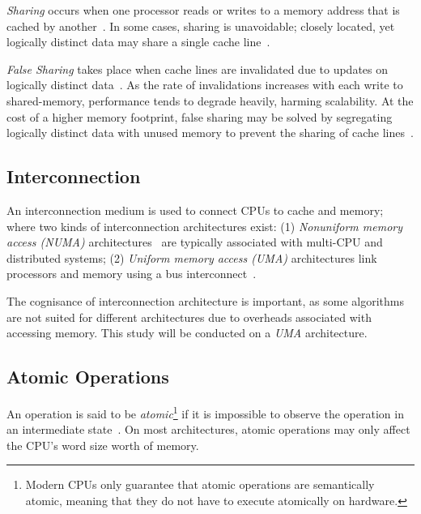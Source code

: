 \emph{Sharing} occurs when one processor reads or writes to a memory address that
is cached by another~\citep{herlihy2020art_cachecoherence}. In some cases,
sharing is unavoidable; closely located, yet
logically distinct data may share a single cache
line~\citep{herlihy2020art_cachecoherence}. 

\emph{False Sharing} takes place when cache lines are invalidated due to updates
on logically distinct data~\citep{herlihy2020art_cachecoherence}. As the
rate of invalidations increases with each write to shared-memory, performance
tends to degrade heavily, harming scalability. At the cost of a higher memory footprint, false
sharing may be solved by segregating logically distinct data with unused memory
to prevent the sharing of cache lines~\citep{scott2013shared}.

\subsection{Interconnection}

An interconnection medium is used to connect CPUs to cache and memory; where
two kinds of interconnection architectures exist: (1)
\emph{Nonuniform memory access (NUMA)}
architectures~\citep[Appendix~B.3]{herlihy2020art} are typically associated with
multi-CPU and distributed systems; (2) \emph{Uniform memory
access (UMA)} architectures link processors and memory using a bus
interconnect~\citep[Appendix~B.3]{herlihy2020art}.

The cognisance of interconnection architecture is important, 
as some algorithms are not suited for different architectures due to
overheads associated with accessing memory. This study will be
conducted on a \emph{UMA} architecture.

\subsection{Atomic Operations}
An operation is said to be \emph{atomic}\footnote{Modern CPUs only guarantee
that atomic operations are semantically atomic, meaning that they do not
have to execute atomically on hardware.} if it is impossible to observe the operation in an
intermediate state~\citep{perfbook2021}. On most architectures, atomic
operations may only affect the CPU's word size worth of memory.

